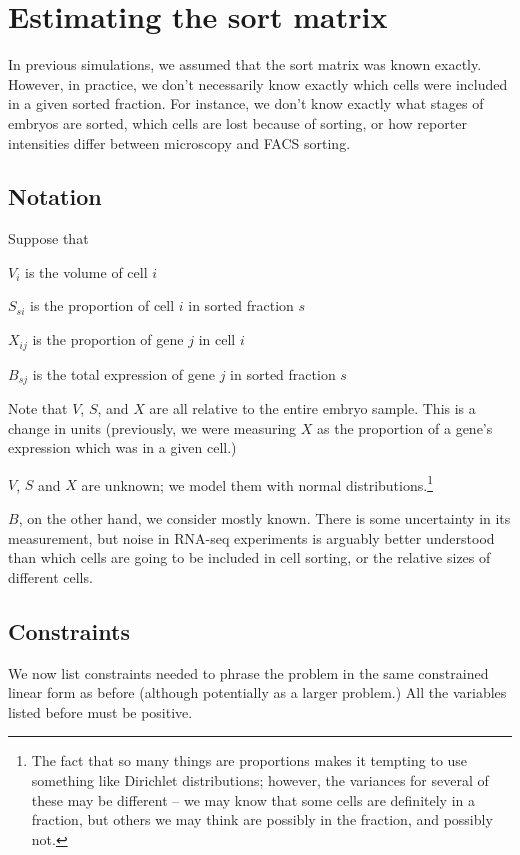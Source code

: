 \documentclass{article}
\begin{document}
\section{Estimating the sort matrix}

In previous simulations, we assumed that the sort matrix was
known exactly. However, in practice, we don't necessarily know
exactly which cells were included in a given sorted fraction.
For instance, we don't know exactly what stages of embryos are
sorted, which cells are lost because of sorting, or how reporter
intensities differ between microscopy and FACS sorting.

\subsection{Notation}

Suppose that

$V_i$ is the volume of cell $i$

$S_{si}$ is the proportion of cell $i$ in sorted fraction $s$

$X_{ij}$ is the proportion of gene $j$ in cell $i$

$B_{sj}$ is the total expression of gene $j$ in sorted fraction $s$

\vspace{4mm}

Note that $V$, $S$, and $X$ are all relative to the entire embryo sample.
This is a change in units (previously, we were measuring $X$ as
the proportion of a gene's expression which was in a given cell.)

$V$, $S$ and $X$ are unknown; we model them with normal
distributions.\footnote{The fact that so many things are proportions makes it tempting
to use something like Dirichlet distributions; however, the variances
for several of these may be different -- we may know that some cells
are definitely in a fraction, but others we may think are possibly 
in the fraction, and possibly not.}

$B$, on the other hand, we consider mostly known. There is some
uncertainty in its measurement, but noise in RNA-seq experiments
is arguably better understood than which cells are going to be
included in cell sorting, or the relative sizes of different cells.

\subsection{Constraints}

We now list constraints needed to phrase the problem in the same
constrained linear form as before (although potentially as a larger
problem.) All the variables listed before must be positive.
\end{document}
